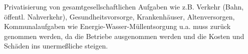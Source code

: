 Privatisierung von gesamtgesellschaftlichen Aufgaben wie z.B. Verkehr (Bahn, öffentl. Nahverkehr), Gesundheitsvorsorge, Krankenhäuser, Altenversorgen, Kommunalaufgaben wie Energie-Wasser-Müllentsorgung u.a. muss zurück genommen werden, da die Betriebe ausgenommen werden und die Kosten und Schäden ins unermeßliche steigen.
